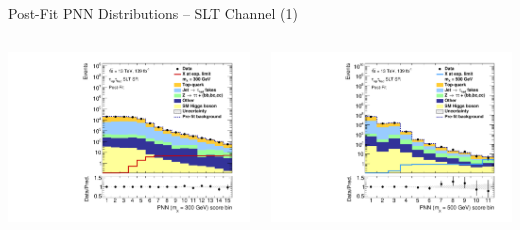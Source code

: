 \documentclass[11pt, xcolor={dvipsnames}, aspectratio=169]{beamer}
\begin{document}

\begin{frame}{Post-Fit PNN Distributions -- \allbold{\lephad} SLT Channel (1)}
  \begin{columns}
    \centering


    \includegraphics[width=\textwidth]{results_res/postfit/Region_BMin0_incJet1_dist300_J2_D2HDMPNN_T2_SpcTauLH_Y2015_LTT0_L1_GlobalFit_conditionnal_mu0log}

    \centering


    \includegraphics[width=\textwidth]{results_res/postfit/Region_BMin0_incJet1_dist500_J2_D2HDMPNN_T2_SpcTauLH_Y2015_LTT0_L1_GlobalFit_conditionnal_mu0log}


\end{columns}
\end{frame}
\end{document}
